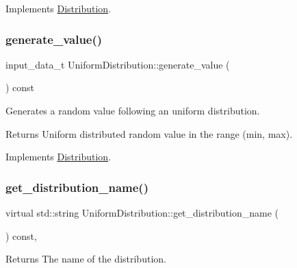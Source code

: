 Implements \hyperlink{classDistribution_a5146d1193531b15a872d401cb97f06ca}{Distribution}.

\mbox{\label{classUniformDistribution_a3a5482105f2b3cabc7a2cc33ce27c1ea}} 
\subsubsection{\texorpdfstring{generate\+\_\+value()}{generate\_value()}}
{\footnotesize\ttfamily input\+\_\+data\+\_\+t Uniform\+Distribution\+::generate\+\_\+value (\begin{DoxyParamCaption}{ }\end{DoxyParamCaption}) const\hspace{0.3cm}{\ttfamily [virtual]}}

Generates a random value following an uniform distribution. \begin{DoxyReturn}{Returns}
Uniform distributed random value in the range (min, max). 
\end{DoxyReturn}


Implements \hyperlink{classDistribution_a096af8a5e59bd38e0ad7da10632e0c83}{Distribution}.

\mbox{\label{classUniformDistribution_a41a9a47839d15e67d5e2432f983ed382}} 
\subsubsection{\texorpdfstring{get\+\_\+distribution\+\_\+name()}{get\_distribution\_name()}}
{\footnotesize\ttfamily virtual std\+::string Uniform\+Distribution\+::get\+\_\+distribution\+\_\+name (\begin{DoxyParamCaption}{ }\end{DoxyParamCaption}) const\hspace{0.3cm}{\ttfamily [inline]}, {\ttfamily [virtual]}}

\begin{DoxyReturn}{Returns}
The name of the distribution. 
\end{DoxyReturn}


